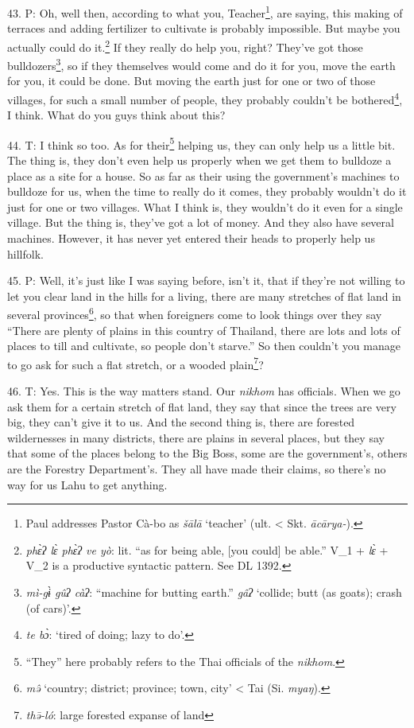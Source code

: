 43. P: Oh, well then, according to what you, Teacher\footnote{Paul addresses Pastor Cà-bo as \textit{šālā} `teacher' (ult. < Skt. \textit{ācārya-}).}, are saying, this making
of terraces and adding fertilizer to cultivate is probably impossible. But maybe
you actually could do it.\footnote{\textit{phɛ̀ʔ lɛ̀ phɛ̀ʔ ve yò}: lit. ``as for being able, [you could] be able.'' V\_1 + \textit{lɛ̀} + V\_2 is a productive syntactic pattern. See DL 1392.} If they really do help you, right? They've got those
bulldozers\footnote{\textit{mì-gɨ̀ gûʔ càʔ}: ``machine for butting earth.'' \textit{gâʔ} `collide; butt (as goats); crash (of cars)'.}, so if they themselves would come and do it for you, move the earth
for you, it could be done. But moving the earth just for one or two of those villages,
for such a small number of people, they probably couldn't be bothered\footnote{\textit{te bɔ̀}: `tired of doing; lazy to do'.}, I think.
What do you guys think about this?

44. T: I think so too. As for their\footnote{``They'' here probably refers to the Thai officials of the \textit{nikhom}.} helping us, they can only help us a little
bit. The thing is, they don't even help us properly when we get them to bulldoze
a place as a site for a house. So as far as their using the government's machines
to bulldoze for us, when the time to really do it comes, they probably wouldn't
do it just for one or two villages. What I think is, they wouldn't do it even for
a single village. But the thing is, they've got a lot of money. And they also have
several machines. However, it has never yet entered their heads to properly help
us hillfolk.

45. P: Well, it's just like I was saying before, isn't it, that if they're not
willing to let you clear land in the hills for a living, there are many stretches
of flat land in several provinces\footnote{\textit{mə̂} `country; district; province; town, city' < Tai (Si. \textit{myaŋ}).}, so that when foreigners come to look things
over they say ``There are plenty of plains in this country of Thailand, there are
lots and lots of places to till and cultivate, so people don't starve.'' So then
couldn't you manage to go ask for such a flat stretch, or a wooded plain\footnote{\textit{thə̄-ló}: large forested expanse of land}?

46. T: Yes. This is the way matters stand. Our \textit{nikhom} has officials. When
we go ask them for a certain stretch of flat land, they say that since the trees
are very big, they can't give it to us. And the second thing is, there are forested
wildernesses in many districts, there are plains in several places, but they say
that some of the places belong to the Big Boss, some are the government's, others
are the Forestry Department's. They all have made their claims, so there's no way
for us Lahu to get anything.

